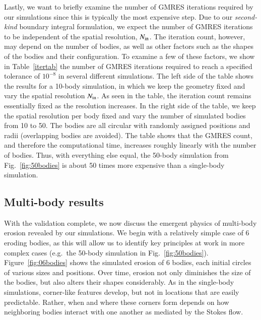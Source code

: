 \documentclass[preprint, 10pt]{elsarticle}
\begin{document}
Lastly, we want to briefly examine the number of GMRES iterations required by our simulations since this is typically the most expensive step. Due to our {\em second-kind} boundary integral formulation, we expect the number of GMRES iterations to be independent of the spatial resolution, $N_{\mathrm{in}}$. The iteration count, however, may depend on the number of bodies, as well as other factors such as the shapes of the bodies and their configuration. To examine a few of these factors, we show in Table~\ref{itertab} the number of GMRES iterations required to reach a specified tolerance of $10^{-8}$ in several different simulations. The left side of the table shows the results for a 10-body simulation, in which we keep the geometry fixed and vary the spatial resolution $N_{\mathrm{in}}$. As seen in the table, the iteration count remains essentially fixed as the resolution increases. In the right side of the table, we keep the spatial resolution per body fixed and vary the number of simulated bodies from 10 to 50. The bodies are all circular with randomly assigned positions and radii (overlapping bodies are avoided). The table shows that the GMRES count, and therefore the computational time, increases roughly linearly with the number of bodies. Thus, with everything else equal, the 50-body simulation from Fig.~\ref{fig:50bodies} is about 50 times more expensive than a single-body simulation.


\subsection{Multi-body results}

With the validation complete, we now discuss the emergent physics of multi-body erosion revealed by our simulations. We begin with a relatively simple case of 6 eroding bodies, as this will allow us to identify key principles at work in more complex cases (e.g.~the 50-body simulation in Fig.~\ref{fig:50bodies}). Figure~\ref{fig:06bodies} shows the simulated erosion of 6 bodies, each initial circles of various sizes and positions. Over time, erosion not only diminishes the size of the bodies, but also alters their shapes considerably. As in the single-body simulations, corner-like features develop, but not in locations that are easily predictable. Rather, when and where these corners form depends on how neighboring bodies interact with one another as mediated by the Stokes flow.
\end{document}
